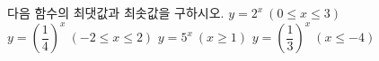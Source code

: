 다음 함수의 최댓값과 최솟값을 구하시오.
 $y=2^x\ (0\le x\le 3)$
 $y=\left(\dfrac{1}{4}\right)^{x}\ (-2\le x\le 2)$
 $y=5^x\ (x\ge 1)$
 $y=\left(\dfrac{1}{3}\right)^{x}\ (x\le -4)$
